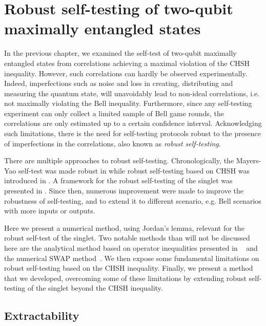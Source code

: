 \chapter{Robust self-testing of two-qubit maximally entangled states}
\label{chap:robust}

In the previous chapter, we examined the self-test of two-qubit maximally entangled states from correlations achieving a maximal violation of the CHSH inequality.
However, such correlations can hardly be observed experimentally. 
Indeed, imperfections such as noise and loss in creating, distributing and measuring the quantum state, will unavoidably lead to non-ideal correlations, i.e. not maximally violating the Bell inequality.
Furthermore, since any self-testing experiment can only collect a limited sample of Bell game rounds, the correlations are only estimated up to a certain confidence interval. %
Acknowledging such limitations, there is the need for self-testing protocols robust to the presence of imperfections in the correlations, also known as \textit{robust self-testing}.

There are multiple approaches to robust self-testing. 
Chronologically, the Mayers-Yao self-test was made robust in \cite{Magniez2006} while robust self-testing based on CHSH was introduced in \cite{Bardyn2009}.
A framework for the robust self-testing of the singlet was presented in \cite{McKague2012}.
Since then, numerous improvement were made to improve the robustness of self-testing, and to extend it to different scenario, e.g. Bell scenarios with more inputs or outputs.

Here we present a numerical method, using Jordan's lemma, relevant for the robust self-test of the singlet. 
Two notable methods than will not be discussed here are the analytical method based on operator inequalities presented in ~\cite{Kaniewski2016} and the numerical SWAP method~\cite{Bancal2015}.
We then expose some fundamental limitations on robust self-testing based on the CHSH inequality.
Finally, we present a method that we developed, overcoming some of these limitations by extending robust self-testing of the singlet beyond the CHSH inequality.

\section{Extractability}
\label{sec:extractability}

